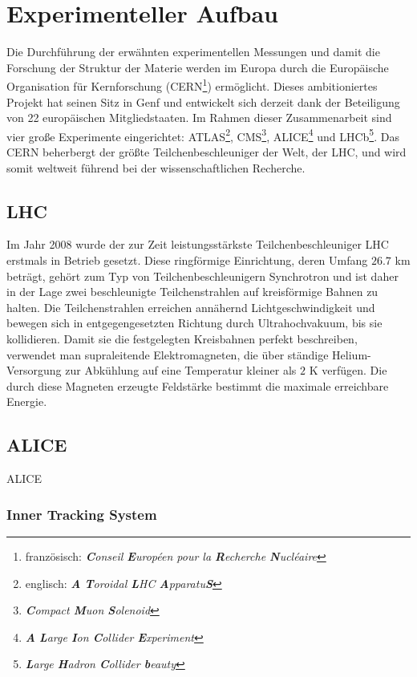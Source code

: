 \documentclass[12pt,a4paper]{report}
\begin{document}
\chapter{Experimenteller Aufbau}
\label{cha:EAufbau}
Die Durchführung der erwähnten experimentellen Messungen und damit die Forschung der Struktur der Materie werden im Europa durch die Europäische Organisation für Kernforschung (CERN\footnote{französisch: \textit{\textbf{C}onseil \textbf{E}uropéen pour la \textbf{R}echerche \textbf{N}ucléaire}}) ermöglicht. Dieses ambitioniertes Projekt hat seinen Sitz in Genf und entwickelt sich derzeit dank der Beteiligung von 22 europäischen Mitgliedstaaten. Im Rahmen dieser Zusammenarbeit sind vier große Experimente eingerichtet: ATLAS\footnote{englisch: \textit{\textbf{A} \textbf{T}oroidal \textbf{L}HC \textbf{A}pparatu\textbf{S}}}, CMS\footnote{\textit{\textbf{C}ompact \textbf{M}uon \textbf{S}olenoid}}, ALICE\footnote{\textit{\textbf{A} \textbf{L}arge \textbf{I}on \textbf{C}ollider \textbf{E}xperiment}} und LHCb\footnote{\textit{\textbf{L}arge \textbf{H}adron \textbf{C}ollider \textbf{b}eauty}}. Das CERN beherbergt der größte Teilchenbeschleuniger der Welt, der LHC, und wird somit weltweit führend bei der wissenschaftlichen Recherche.  
\section{LHC}
\label{sec:LHC}
Im Jahr 2008 wurde der zur Zeit leistungsstärkste Teilchenbeschleuniger LHC erstmals in Betrieb gesetzt. Diese ringförmige Einrichtung, deren Umfang $26.7$ km beträgt, gehört zum Typ von Teilchenbeschleunigern Synchrotron und ist daher in der Lage zwei beschleunigte Teilchenstrahlen auf kreisförmige Bahnen zu halten. Die Teilchenstrahlen erreichen annähernd Lichtgeschwindigkeit und bewegen sich in entgegengesetzten Richtung durch Ultrahochvakuum, bis sie kollidieren. Damit sie die festgelegten Kreisbahnen perfekt beschreiben, verwendet man supraleitende Elektromagneten, die über ständige Helium-Versorgung zur Abkühlung auf eine Temperatur kleiner als $2$ K verfügen. Die durch diese Magneten erzeugte Feldstärke bestimmt die maximale erreichbare Energie.
\section{ALICE}
\label{sec:ALICE}
ALICE
\subsection{Inner Tracking System}
\end{document}
